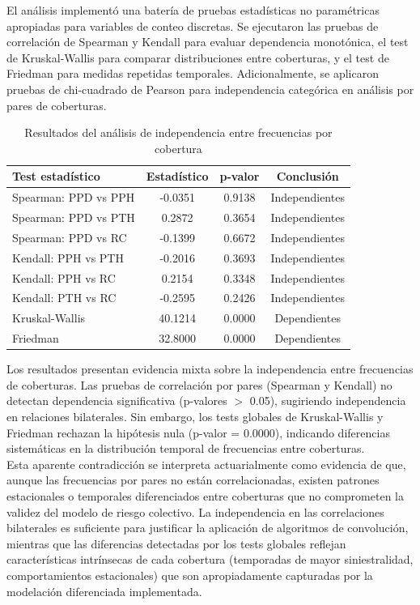 El análisis implementó una batería de pruebas estadísticas no paramétricas apropiadas para variables de conteo discretas. Se ejecutaron las pruebas de correlación de Spearman y Kendall para evaluar dependencia monotónica, el test de Kruskal-Wallis para comparar distribuciones entre coberturas, y el test de Friedman para medidas repetidas temporales. Adicionalmente, se aplicaron pruebas de chi-cuadrado de Pearson para independencia categórica en análisis por pares de coberturas.

\begin{table}[H]
\centering
\caption{Resultados del análisis de independencia entre frecuencias por cobertura}
\begin{tabular}{lccc}
\hline
\textbf{Test estadístico} & \textbf{Estadístico} & \textbf{p-valor} & \textbf{Conclusión} \\
\hline
Spearman: PPD vs PPH & -0.0351 & 0.9138 & Independientes \\
Spearman: PPD vs PTH & 0.2872 & 0.3654 & Independientes \\
Spearman: PPD vs RC & -0.1399 & 0.6672 & Independientes \\
Kendall: PPH vs PTH & -0.2016 & 0.3693 & Independientes \\
Kendall: PPH vs RC & 0.2154 & 0.3348 & Independientes \\
Kendall: PTH vs RC & -0.2595 & 0.2426 & Independientes \\
Kruskal-Wallis & 40.1214 & 0.0000 & Dependientes \\
Friedman & 32.8000 & 0.0000 & Dependientes \\
\hline
\end{tabular}
\end{table}

Los resultados presentan evidencia mixta sobre la independencia entre frecuencias de coberturas. Las pruebas de correlación por pares (Spearman y Kendall) no detectan dependencia significativa (p-valores $>$ 0.05), sugiriendo independencia en relaciones bilaterales. Sin embargo, los tests globales de Kruskal-Wallis y Friedman rechazan la hipótesis nula (p-valor = 0.0000), indicando diferencias sistemáticas en la distribución temporal de frecuencias entre coberturas.\\

Esta aparente contradicción se interpreta actuarialmente como evidencia de que, aunque las frecuencias por pares no están correlacionadas, existen patrones estacionales o temporales diferenciados entre coberturas que no comprometen la validez del modelo de riesgo colectivo. La independencia en las correlaciones bilaterales es suficiente para justificar la aplicación de algoritmos de convolución, mientras que las diferencias detectadas por los tests globales reflejan características intrínsecas de cada cobertura (temporadas de mayor siniestralidad, comportamientos estacionales) que son apropiadamente capturadas por la modelación diferenciada implementada.

